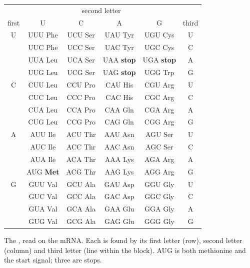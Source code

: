 \begin{omfigure}
\begin{tabular}{c|cccc|c}
\multicolumn{1}{c}{} & \multicolumn{4}{c}{\small second letter} & \multicolumn{1}{c}{} \\
{\small first} & U & C & A & G & {\small third} \\ \hline
U & UUU Phe & UCU Ser & UAU Tyr & UGU Cys & U \\
 & UUC Phe & UCC Ser & UAC Tyr & UGC Cys & C \\
 & UUA Leu & UCA Ser & UAA \textbf{stop} & UGA \textbf{stop} & A \\
 & UUG Leu & UCG Ser & UAG \textbf{stop} & UGG Trp & G \\ \hline
C & CUU Leu & CCU Pro & CAU His & CGU Arg & U \\
 & CUC Leu & CCC Pro & CAC His & CGC Arg & C \\
 & CUA Leu & CCA Pro & CAA Gln & CGA Arg & A \\
 & CUG Leu & CCG Pro & CAG Gln & CGG Arg & G \\ \hline
A & AUU Ile & ACU Thr & AAU Asn & AGU Ser & U \\
 & AUC Ile & ACC Thr & AAC Asn & AGC Ser & C \\
 & AUA Ile & ACA Thr & AAA Lys & AGA Arg & A \\
 & AUG \textbf{Met} & ACG Thr & AAG Lys & AGG Arg & G \\ \hline
G & GUU Val & GCU Ala & GAU Asp & GGU Gly & U \\
 & GUC Val & GCC Ala & GAC Asp & GGC Gly & C \\
 & GUA Val & GCA Ala & GAA Glu & GGA Gly & A \\
 & GUG Val & GCG Ala & GAG Glu & GGG Gly & G \\
\end{tabular}

{\small The , read on the mRNA. Each  is found by its
first letter (row), second letter (column) and third letter (line
within the block). AUG is both methionine and the start signal; three
 are stops.}
\end{omfigure}

